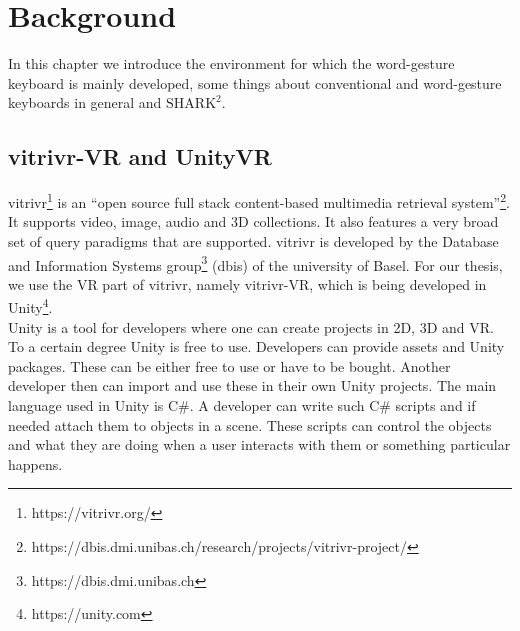 \chapter{Background}

In this chapter we introduce the environment for which the word-gesture keyboard is mainly developed, some things about conventional and word-gesture keyboards in general and $\text{SHARK}^2$.

\section{vitrivr-VR and UnityVR}
vitrivr\footnote{https://vitrivr.org/} is an ``open source full stack content-based multimedia retrieval system''\footnote{https://dbis.dmi.unibas.ch/research/projects/vitrivr-project/}. It supports video, image, audio and 3D collections. It also features a very broad set of query paradigms that are supported. vitrivr is developed by the Database and Information Systems group\footnote{https://dbis.dmi.unibas.ch} (dbis) of the university of Basel. For our thesis, we use the VR part of vitrivr, namely vitrivr-VR, which is being developed in Unity\footnote{https://unity.com}.\\
Unity is a tool for developers where one can create projects in 2D, 3D and VR. To a certain degree Unity is free to use. Developers can provide assets and Unity packages. These can be either free to use or have to be bought. Another developer then can import and use these in their own Unity projects. The main language used in Unity is C\#. A developer can write such C\# scripts and if needed attach them to objects in a scene. These scripts can control the objects and what they are doing when a user interacts with them or something particular happens. 

